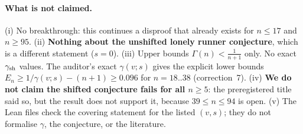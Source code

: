 \documentclass[10pt]{article}
\begin{document}
\paragraph{What is not claimed.} (i) No breakthrough: this continues a disproof that already exists for $n\le17$ and $n\ge95$. (ii) \textbf{Nothing about the unshifted lonely runner conjecture}, which is a different statement ($s=0$). (iii) Upper bounds $\Gamma(n)<\frac1{n+1}$ only. No exact $\gamma_{\rm sh}$ values. The auditor's exact $\gamma(v;s)$ gives the explicit lower bounds $E_n\ge1/\gamma(v;s)-(n+1)\ge0.096$ for $n=18..38$ (correction~7). (iv) \textbf{We do not claim the shifted conjecture fails for all $n\ge5$}: the preregistered title said so, but the result does not support it, because $39\le n\le94$ is open. (v) The Lean files check the covering statement for the listed $(v,s)$; they do not formalise $\gamma$, the conjecture, or the literature.

\end{document}
